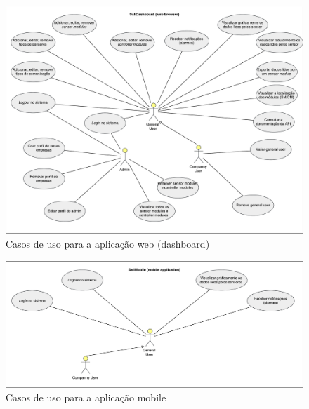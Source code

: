 \begin{figure}[!htb]
	\centering
	\includegraphics[width=\linewidth]{esquemas/use-case-web.pdf}
	\caption{Casos de uso para a aplicação web (dashboard) }
	\label{usedash}
\end{figure}



\begin{figure}[!htb]
	\centering
	\includegraphics[width=\linewidth]{esquemas/use-case-mobile.pdf}
	\caption{Casos de uso para a aplicação mobile}
	\label{useMobile}
\end{figure}




